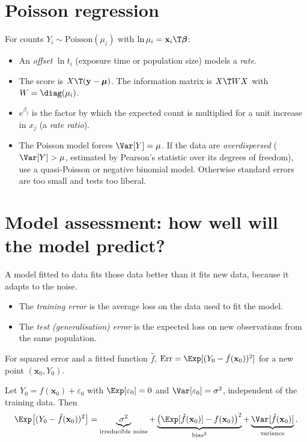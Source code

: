 \section{Poisson regression}

For counts $Y_i\sim\mathrm{Poisson}(\mu_i)$ with $\ln\mu_i=\mathbf{x}_i\T\boldsymbol\beta$:
\begin{itemize}
  \item An \emph{offset} $\ln t_i$ (exposure time or population size) models a \emph{rate}.
  \item The score is $X\T(\mathbf{y}-\boldsymbol\mu)$. The information matrix is $X\T WX$ with $W=\diag(\mu_i)$.
  \item $e^{\beta_j}$ is the factor by which the expected count is multiplied for a unit increase in $x_j$ (a \emph{rate ratio}).
  \item The Poisson model forces $\Var[Y]=\mu$. If the data are \emph{overdispersed} ($\Var[Y]>\mu$, estimated by Pearson's statistic over its degrees of freedom), use a quasi-Poisson or negative binomial model. Otherwise standard errors are too small and tests too liberal.
\end{itemize}

\section{Model assessment: how well will the model predict?}

A model fitted to data fits those data better than it fits new data, because it adapts to the noise.

\begin{definition}
\begin{itemize}
  \item The \emph{training error} is the average loss on the data used to fit the model.
  \item The \emph{test (generalisation) error} is the expected loss on new observations from the same population.
\end{itemize}
For squared error and a fitted function $\hat{f}$, $\mathrm{Err}=\Exp[(Y_0-\hat{f}(\mathbf{x}_0))^2]$ for a new point $(\mathbf{x}_0,Y_0)$.
\end{definition}

\begin{theorem}\label{thm:biasvar-pred}
Let $Y_0=f(\mathbf{x}_0)+\varepsilon_0$ with $\Exp[\varepsilon_0]=0$ and $\Var[\varepsilon_0]=\sigma^2$, independent of the training data. Then
\[ \Exp\big[(Y_0-\hat{f}(\mathbf{x}_0))^2\big]=\underbrace{\sigma^2}_{\text{irreducible noise}}+\underbrace{\big(\Exp[\hat{f}(\mathbf{x}_0)]-f(\mathbf{x}_0)\big)^2}_{\text{bias}^2}+\underbrace{\Var[\hat{f}(\mathbf{x}_0)]}_{\text{variance}}. \]
\end{theorem}

